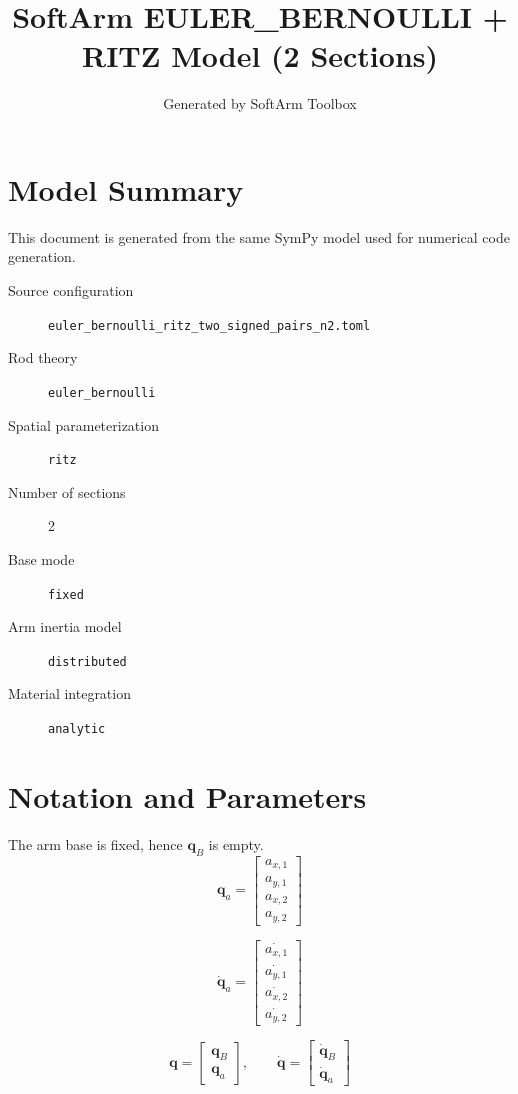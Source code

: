 \documentclass[11pt]{article}
\title{SoftArm EULER\_BERNOULLI + RITZ Model (2 Sections)}
\author{Generated by SoftArm Toolbox}
\date{}
\begin{document}
\maketitle

\section{Model Summary}
This document is generated from the same SymPy model used for numerical code generation.
\begin{description}
\item[Source configuration] \texttt{euler\_bernoulli\_ritz\_two\_signed\_pairs\_n2.toml}
\item[Rod theory] \texttt{euler\_bernoulli}
\item[Spatial parameterization] \texttt{ritz}
\item[Number of sections] 2
\item[Base mode] \texttt{fixed}
\item[Arm inertia model] \texttt{distributed}
\item[Material integration] \texttt{analytic}
\end{description}

\section{Notation and Parameters}
The arm base is fixed, hence $\boldsymbol q_B$ is empty.
\begin{equation}
\boldsymbol q_a=\begin{bmatrix}a_{x,1}\\a_{y,1}\\a_{x,2}\\a_{y,2}\end{bmatrix}
\end{equation}

\begin{equation}
\dot{\boldsymbol q}_a=\begin{bmatrix}\dot{a_{x,1}}\\\dot{a_{y,1}}\\\dot{a_{x,2}}\\\dot{a_{y,2}}\end{bmatrix}
\end{equation}

\begin{equation}
\boldsymbol q=\begin{bmatrix}\boldsymbol q_B\\\boldsymbol q_a\end{bmatrix},\qquad \dot{\boldsymbol q}=\begin{bmatrix}\dot{\boldsymbol q}_B\\\dot{\boldsymbol q}_a\end{bmatrix}
\end{equation}
\end{document}
